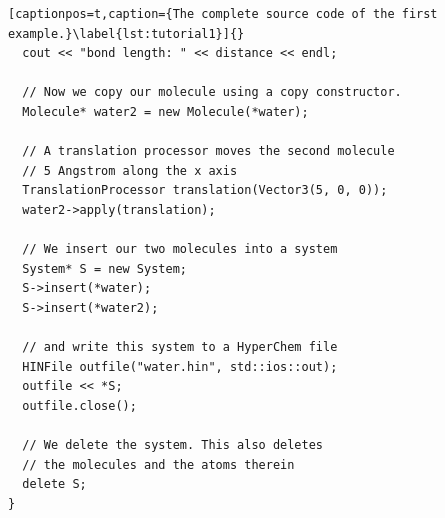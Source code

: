 \begin{lstlisting}[captionpos=t,caption={The complete source code of the first example.}\label{lst:tutorial1}]{}
  cout << "bond length: " << distance << endl;

  // Now we copy our molecule using a copy constructor.
  Molecule* water2 = new Molecule(*water);

  // A translation processor moves the second molecule
  // 5 Angstrom along the x axis
  TranslationProcessor translation(Vector3(5, 0, 0));
  water2->apply(translation);

  // We insert our two molecules into a system
  System* S = new System;
  S->insert(*water);
  S->insert(*water2);

  // and write this system to a HyperChem file
  HINFile outfile("water.hin", std::ios::out);
  outfile << *S;
  outfile.close();

  // We delete the system. This also deletes 
  // the molecules and the atoms therein
  delete S;
}
\end{lstlisting}
